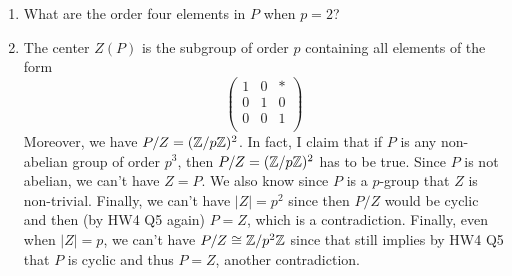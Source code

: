 \documentclass[../notes.tex]{subfiles}
\begin{document}
\begin{itemize}
\begin{itemize}
\begin{enumerate}
            \item What are the order four elements in $P$ when $p=2$?
            \item The center $Z(P)$ is the subgroup of order $p$ containing all elements of the form
            \begin{equation*}
                \begin{pmatrix}
                    1 & 0 & *\\
                    0 & 1 & 0\\
                    0 & 0 & 1\\
                \end{pmatrix}
            \end{equation*}
            Moreover, we have $P/Z=(\mathbb{Z}/p\mathbb{Z})^2$. In fact, I claim that if $P$ is any non-abelian group of order $p^3$, then $P/Z=(\mathbb{Z}/p\mathbb{Z})^2$ has to be true. Since $P$ is not abelian, we can't have $Z=P$. We also know since $P$ is a $p$-group that $Z$ is non-trivial. Finally, we can't have $|Z|=p^2$ since then $P/Z$ would be cyclic and then (by HW4 Q5 again) $P=Z$, which is a contradiction. Finally, even when $|Z|=p$, we can't have $P/Z\cong\mathbb{Z}/p^2\mathbb{Z}$ since that still implies by HW4 Q5 that $P$ is cyclic and thus $P=Z$, another contradiction.

\end{enumerate}
\end{itemize}
\end{itemize}
\end{document}

